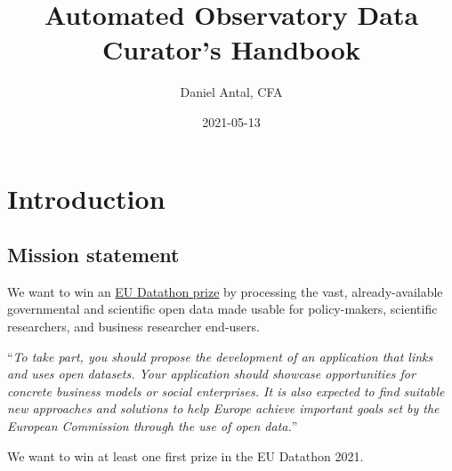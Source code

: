 \documentclass[
  a4paper,
  openany, a4paper, oneside]{book}
\title{Automated Observatory Data Curator's Handbook}
\author{Daniel Antal, CFA}
\date{2021-05-13}
\begin{document}
\maketitle

{
\hypersetup{linkcolor=}
\setcounter{tocdepth}{1}
\tableofcontents
}
\listoffigures
{}
\hypertarget{introduction}{%
\chapter*{Introduction}\label{introduction}}

\hypertarget{mission-statement}{%
\section*{Mission statement}\label{mission-statement}}

We want to win an \href{https://op.europa.eu/en/web/eudatathon}{EU Datathon prize} by processing the vast, already-available governmental and scientific open data made usable for policy-makers, scientific researchers, and business researcher end-users.

``\emph{To take part, you should propose the development of an application that links and uses open datasets. Your application should showcase opportunities for concrete business models or social enterprises. It is also expected to find suitable new approaches and solutions to help Europe achieve important goals set by the European Commission through the use of open data.}''

We want to win at least one first prize in the EU Datathon 2021.
\end{document}

